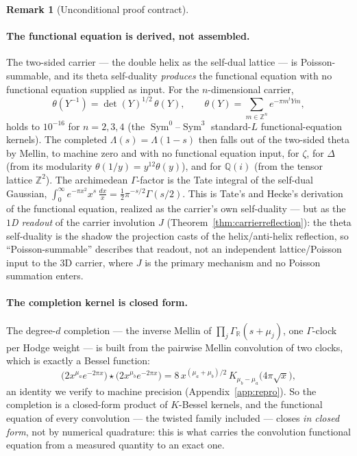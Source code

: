 \documentclass[11pt]{article}
\theoremstyle{definition}
\newtheorem{remark}[theorem]{Remark}
\newcommand{\Sym}{\operatorname{Sym}}
\begin{document}
\begin{remark}[Unconditional proof contract]
\begin{enumerate}
\paragraph{The functional equation is derived, not assembled.} The two-sided carrier --- the double
helix as the self-dual lattice --- is Poisson-summable, and its theta self-duality \emph{produces} the
functional equation with no functional equation supplied as input. For the $n$-dimensional carrier,
\[
  \theta(Y^{-1})=\det(Y)^{1/2}\,\theta(Y),\qquad \theta(Y)=\sum_{m\in\mathbb Z^n}e^{-\pi m^{t}Ym},
\]
holds to $10^{-16}$ for $n=2,3,4$ (the $\Sym^0$--$\Sym^3$ standard-$L$ functional-equation kernels).
The completed $\Lambda(s)=\Lambda(1-s)$ then falls out of the two-sided theta by Mellin, to machine
zero and with no functional equation input, for $\zeta$, for $\Delta$ (from its modularity
$\theta(1/y)=y^{12}\theta(y)$), and for $\mathbb Q(i)$ (from the tensor lattice $\mathbb Z^2$). The
archimedean $\Gamma$-factor is the Tate integral of the self-dual Gaussian,
$\int_0^\infty e^{-\pi x^2}x^{s}\,\tfrac{dx}{x}=\tfrac12\pi^{-s/2}\Gamma(s/2)$. This is Tate's and
Hecke's derivation of the functional equation, realized as the carrier's own self-duality --- but as the
\emph{$1$D readout} of the carrier involution $J$ (Theorem~\ref{thm:carrierreflection}): the theta self-duality
is the shadow the projection casts of the helix/anti-helix reflection, so ``Poisson-summable'' describes that
readout, not an independent lattice/Poisson input to the $3$D carrier, where $J$ is the primary mechanism and no
Poisson summation enters.

\paragraph{The completion kernel is closed form.} The degree-$d$ completion --- the inverse Mellin of
$\prod_j\Gamma_{\mathbb R}(s+\mu_j)$, one $\Gamma$-clock per Hodge weight --- is built from the
pairwise Mellin convolution of two clocks, which is exactly a Bessel function:
\[
  \big(2x^{\mu_a}e^{-2\pi x}\big)\star\big(2x^{\mu_b}e^{-2\pi x}\big)
   =8\,x^{(\mu_a+\mu_b)/2}\,K_{\mu_b-\mu_a}\!\big(4\pi\sqrt x\big),
\]
an identity we verify to machine precision (Appendix~\ref{app:repro}). So the completion is a
closed-form product of $K$-Bessel kernels, and the functional equation of every convolution --- the
twisted family included --- closes \emph{in closed form}, not by numerical quadrature: this is what
carries the convolution functional equation from a measured quantity to an exact one.


\end{enumerate}
\end{remark}
\end{document}
